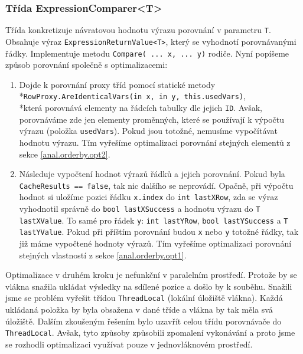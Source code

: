\subsubsection{Třída ExpressionComparer<T>} \label{impl.orderby.opts}

Třída konkretizuje návratovou hodnotu výrazu porovnání v parametru \texttt{T}.
Obsahuje výraz \texttt{ExpressionReturnValue<T>}, který se vyhodnotí porovnávanými řádky.
Implementuje metodu \texttt{Compare( ... x, ... y)} rodiče.
Nyní popíšeme způsob porovnání společně s optimalizacemi:

\begin{enumerate}
\item Dojde k porovnání proxy tříd pomocí statické metody \\*\texttt{RowProxy.AreIdenticalVars(in x, in y, this.usedVars)}, \\*která
porovnává elementy na řádcích tabulky dle jejich \texttt{ID}.
Avšak, porovnáváme zde jen elementy proměnných, které se používají k výpočtu výrazu (položka \texttt{usedVars}).
Pokud jsou totožné, nemusíme vypočítávat hodnotu výrazu.
Tím vyřešíme optimalizaci porovnání stejných elementů z sekce \ref{anal.orderby.opt2}.

\item Následuje vypočtení hodnot výrazů řádků a jejich porovnání.
Pokud byla \texttt{CacheResults == false}, tak nic dalšího se neprovádí.
Opačně, při výpočtu hodnot si uložíme pozici řádku \texttt{x.index} do \texttt{int lastXRow}, zda se výraz vyhodnotil správně do \texttt{bool lastXSuccess} a hodnotu výrazu do \texttt{T lastXValue}.
To samé pro řádek \texttt{y}: \texttt{int lastYRow}, \texttt{bool lastYSuccess} a \texttt{T lastYValue}.
Pokud při příštím porovnání budou \texttt{x} nebo \texttt{y} totožné řádky, tak již máme vypočtené hodnoty výrazů. 
Tím vyřešíme optimalizaci porovnání stejných vlastností z sekce \ref{anal.orderby.opt1}.
\end{enumerate}

Optimalizace v druhém kroku je nefunkční v paralelním prostředí.
Protože by se vlákna snažila ukládat výsledky na sdílené pozice a došlo by k souběhu.
Snažili jsme se problém vyřešit třídou \texttt{ThreadLocal} (lokální úložiště vlákna).
Každá ukládaná položka by byla obsažena v dané tříde a vlákna by tak měla svá úložiště.
Dalším zkoušeným řešením bylo uzavřít celou třídu porovnávače do \texttt{ThreadLocal}.
Avšak, tyto způsoby způsobili zpomalení vykonávání a proto jsme se rozhodli optimalizaci využívat pouze v jednovláknovém prostředí.

